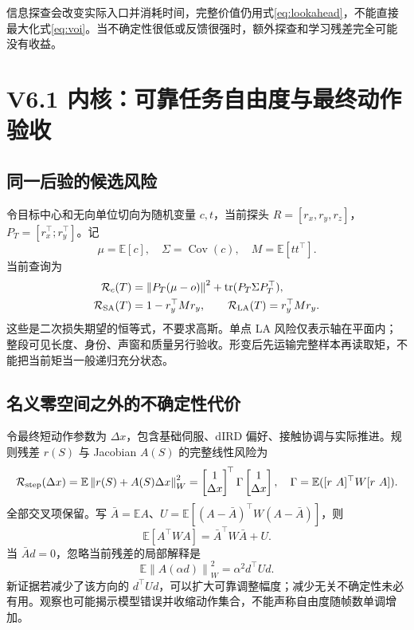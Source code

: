 \documentclass[UTF8,fontset=fandol,11pt,a4paper]{ctexart}
\theoremstyle{plain}
\theoremstyle{definition}
\theoremstyle{remark}
\numberwithin{equation}{section}
\newcommand{\E}{\mathbb E}
\newcommand{\norm}[1]{\left\lVert#1\right\rVert}
\DeclareMathOperator{\tr}{tr}
\DeclareMathOperator{\Cov}{Cov}
\begin{document}
信息探查会改变实际入口并消耗时间，完整价值仍用式\eqref{eq:lookahead}，不能直接最大化式\eqref{eq:voi}。当不确定性很低或反馈很强时，额外探查和学习残差完全可能没有收益。

\section{V6.1 内核：可靠任务自由度与最终动作验收}
\label{sec:risk}
\subsection{同一后验的候选风险}
令目标中心和无向单位切向为随机变量 $c,t$，当前探头 $R=[r_x,r_y,r_z]$，$P_T=[r_x^\top;r_y^\top]$。记
\begin{equation}
\mu=\E[c],\quad\Sigma=\Cov(c),\quad M=\E[tt^\top].
\end{equation}
当前查询为
\begin{align}
\mathcal R_c(T)&=\norm{P_T(\mu-o)}^2+\tr(P_T\Sigma P_T^\top),\\
\mathcal R_{\rm SA}(T)&=1-r_y^\top Mr_y,\qquad
\mathcal R_{\rm LA}(T)=r_y^\top Mr_y.
\label{eq:moments}
\end{align}
这些是二次损失期望的恒等式，不要求高斯。单点 LA 风险仅表示轴在平面内；整段可见长度、身份、声窗和质量另行验收。形变后先运输完整样本再读取矩，不能把当前矩当一般递归充分状态。

\subsection{名义零空间之外的不确定性代价}
令最终短动作参数为 $\Delta x$，包含基础伺服、dIRD 偏好、接触协调与实际推进。规则残差 $r(S)$ 与 Jacobian $A(S)$ 的完整线性风险为
\begin{equation}
\mathcal R_{\rm step}(\Delta x)=
\E\norm{r(S)+A(S)\Delta x}_W^2
=\begin{bmatrix}1\\\Delta x\end{bmatrix}^{\!\top}
\Gamma\begin{bmatrix}1\\\Delta x\end{bmatrix},\quad
\Gamma=\E([r\ A]^\top W[r\ A]).
\label{eq:risk}
\end{equation}
全部交叉项保留。写 $\bar A=\E A$、$U=\E[(A-\bar A)^\top W(A-\bar A)]$，则
\begin{equation}
\E[A^\top WA]=\bar A^\top W\bar A+U.
\end{equation}
当 $\bar A d=0$，忽略当前残差的局部解释是
\begin{equation}
\E\norm{A(\alpha d)}_W^2=\alpha^2d^\top Ud.
\label{eq:freedom}
\end{equation}
新证据若减少了该方向的 $d^\top Ud$，可以扩大可靠调整幅度；减少无关不确定性未必有用。观察也可能揭示模型错误并收缩动作集合，不能声称自由度随帧数单调增加。
\end{document}
